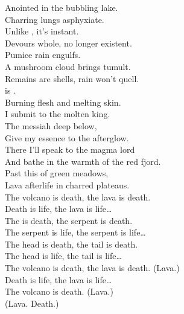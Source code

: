 Anointed in the bubbling lake. \\
Charring lungs asphyxiate. \\
Unlike , it's instant. \\
Devours whole, no longer existent. \\

Pumice rain engulfs. \\
A mushroom cloud brings tumult. \\
Remains are shells, rain won't quell. \\
 is . \\

Burning flesh and melting skin. \\
I submit to the molten king. \\
The messiah deep below, \\
Give my essence to the afterglow. \\

There I'll speak to the magma lord \\
And bathe in the warmth of the red fjord. \\
Past this  of green meadows, \\
Lava afterlife in charred plateaus. \\

The volcano is death, the lava is death. \\
Death is life, the lava is life… \\

The  is death, the serpent is death. \\
The serpent is life, the serpent is life… \\

The head is death, the tail is death. \\
The head is life, the tail is life… \\

The volcano is death, the lava is death. (Lava.) \\
Death is life, the lava is life… \\

The volcano is death. (Lava.) \\
(Lava. Death.) \\




